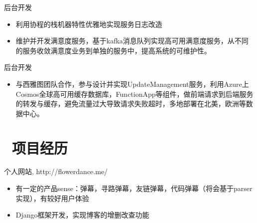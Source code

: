 \documentclass{resume}
\begin{document}
后台开发
\begin{itemize}
  \item 利用协程的栈机器特性优雅地实现服务日志改造
  \item 维护并开发满意度服务，基于kafka消息队列实现高可用满意度服务，从不同的服务收敛满意度业务到单独的服务中，提高系统的可维护性。
\end{itemize}

后台开发
\begin{itemize}
  \item 与西雅图团队合作，参与设计并实现UpdateManagement服务，利用Azure上Cosmos全球高可用缓存数据库，FunctionApp等组件，做前端请求到后端服务的转发与缓存，避免流量过大导致请求失败超时，多地部署在北美，欧洲等数据中心。
\end{itemize}

\section{\faCode\ 项目经历}
\begin{onehalfspacing}
个人网站, http://flowerdance.me/
\begin{itemize}
  \item 有一定的产品sense：弹幕，寻路弹幕，友链弹幕，代码弹幕（将会基于parser实现），有较好用户体验
  \item Django框架开发，实现博客的增删改查功能
\end{itemize}
\end{onehalfspacing}
\end{document}

